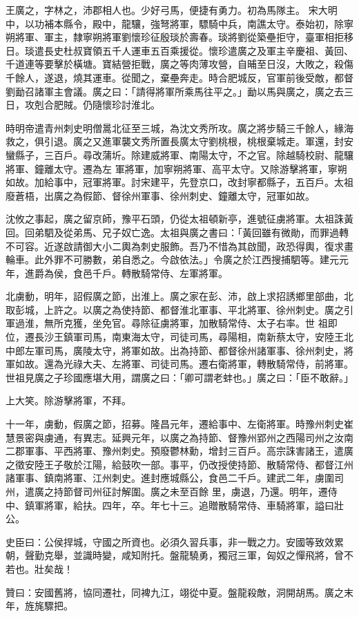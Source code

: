 \begin{pinyinscope}
 王廣之，字林之，沛郡相人也。少好弓馬，便捷有勇力。初為馬隊主。
 宋大明中，以功補本縣令，殿中，龍驤，強弩將軍，驃騎中兵，南譙太守。泰始初，除寧朔將軍、軍主，隸寧朔將軍劉懷珍征殷琰於壽春。琰將劉從築壘拒守，臺軍相拒移日。琰遣長史杜叔寶領五千人運車五百乘援從。懷珍遣廣之及軍主辛慶祖、黃回、千道連等要擊於橫塘。寶結營拒戰，廣之等肉薄攻營，自晡至日沒，大敗之，殺傷千餘人，遂退，燒其運車。從聞之，棄壘奔走。時合肥城反，官軍前後受敵，都督劉勔召諸軍主會議。廣之曰：「請得將軍所乘馬往平之。」勔以馬與廣之，廣之去三日，攻剋合肥賊。仍隨懷珍討淮北。



 時明帝遣青州刺史明僧暠北征至三城，為沈文秀所攻。廣之將步騎三千餘人，緣海救之，俱引退。廣之又進軍襲文秀所置長廣太守劉桃根，桃根棄城走。軍還，封安蠻縣子，三百戶。尋改蒲圻。除建威將軍、南陽太守，不之官。除越騎校尉、龍驤將軍、鐘離太守。遷為左
 軍將軍，加寧朔將軍、高平太守。又除游擊將軍，寧朔如故。加給事中，冠軍將軍。討宋建平，先登京口，改封寧都縣子，五百戶。太祖廢蒼梧，出廣之為假節、督徐州軍事、徐州刺史、鐘離太守，冠軍如故。



 沈攸之事起，廣之留京師，豫平石頭，仍從太祖頓新亭，進號征虜將軍。太祖誅黃回。回弟駟及從弟馬、兄子奴亡逸。太祖與廣之書曰：「黃回雖有微勛，而罪過轉不可容。近遂啟請御大小二輿為刺史服飾。吾乃不惜為其啟聞，政恐得輿，復求畫輪車。此外罪不可勝數，弟自悉之。今啟依法。」令廣之於江西搜捕駟等。建元元年，進爵為侯，食邑千戶。轉散騎常侍、左軍將軍。



 北虜動，明年，詔假廣之節，出淮上。廣之家在彭、沛，啟上求招誘鄉里部曲，北取彭城，上許之。以廣之為使持節、都督淮北軍事、平北將軍、徐州刺史。廣之引軍過淮，無所克獲，坐免官。尋除征虜將軍，加散騎常侍、太子右率。世
 祖即位，遷長沙王鎮軍司馬，南東海太守，司徒司馬，尋陽相，南新蔡太守，安陸王北中郎左軍司馬，廣陵太守，將軍如故。出為持節、都督徐州諸軍事、徐州刺史，將軍如故。還為光祿大夫、左將軍、司徒司馬。遷右衛將軍，轉散騎常侍，前將軍。世祖見廣之子珍國應堪大用，謂廣之曰：「卿可謂老蚌也。」廣之曰：「臣不敢辭。」



 上大笑。除游擊將軍，不拜。



 十一年，虜動，假廣之節，招募。隆昌元年，遷給事中、左衛將軍。時豫州刺史崔慧景密與虜通，有異志。延興元年，以廣之為持節、督豫州郢州之西陽司州之汝南二郡軍事、平西將軍、豫州刺史。預廢鬱林勳，增封三百戶。高宗誅害諸王，遣廣之徵安陸王子敬於江陽，給鼓吹一部。事平，仍改授使持節、散騎常侍、都督江州諸軍事、鎮南將軍、江州刺史。進封應城縣公，食邑二千戶。建武二年，虜圍司州，遣廣之持節督司州征討解圍。廣之未至百餘
 里，虜退，乃還。明年，遷侍中、鎮軍將軍，給扶。四年，卒。年七十三。追贈散騎常侍、車騎將軍，謚曰壯公。



 史臣曰：公侯捍城，守國之所資也。必須久習兵事，非一戰之力。安國等致效累朝，聲勤克舉，並識時變，咸知附托。盤龍驍勇，獨冠三軍，匈奴之憚飛將，曾不若也。壯矣哉！



 贊曰：安國舊將，協同遷社，同裨九江，翊從中夏。盤龍殺敵，洞開胡馬。廣之末年，旌旄驟把。



\end{pinyinscope}